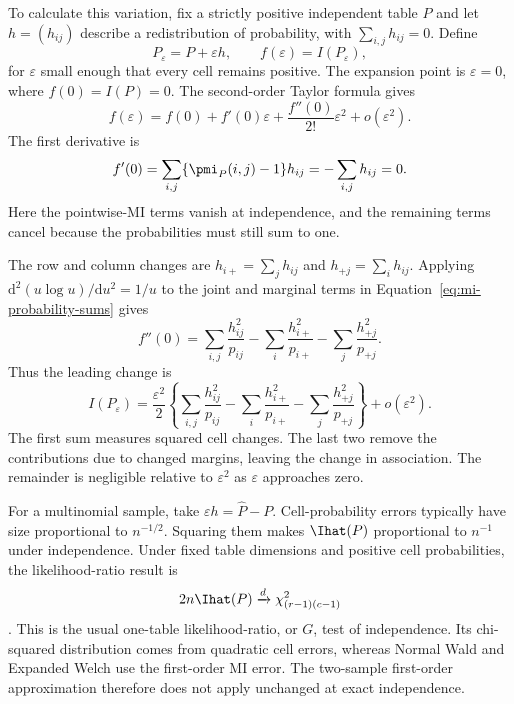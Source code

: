 To calculate this variation, fix a strictly positive independent table
\(P\) and let \(h=(h_{ij})\) describe a redistribution of probability,
with \(\sum_{i,j}h_{ij}=0\). Define
\begin{equation}
 P_\varepsilon=P+\varepsilon h,
 \qquad f(\varepsilon)=I(P_\varepsilon),
\end{equation}
for \(\varepsilon\) small enough that every cell remains positive.
The expansion point is \(\varepsilon=0\), where \(f(0)=I(P)=0\).
The second-order Taylor formula gives
\begin{equation}
 f(\varepsilon)
 =f(0)+f'(0)\varepsilon+\frac{f''(0)}{2!}\varepsilon^2
  +o(\varepsilon^2).
\end{equation}
The first derivative is
\begin{equation}
 f'(0)=\sum_{i,j}\{\pmi_P(i,j)-1\}h_{ij}
       =-\sum_{i,j}h_{ij}=0.
\end{equation}
Here the pointwise-MI terms vanish at independence, and the remaining
terms cancel because the probabilities must still sum to one.

The row and column changes are \(h_{i+}=\sum_jh_{ij}\) and
\(h_{+j}=\sum_ih_{ij}\). Applying
\(\mathrm d^2(u\log u)/\mathrm du^2=1/u\) to the joint and marginal
terms in Equation~\eqref{eq:mi-probability-sums} gives
\begin{equation}
 f''(0)=\sum_{i,j}\frac{h_{ij}^2}{p_{ij}}
        -\sum_i\frac{h_{i+}^2}{p_{i+}}
        -\sum_j\frac{h_{+j}^2}{p_{+j}}.
\end{equation}
Thus the leading change is
\begin{equation}
 I(P_\varepsilon)
 =\frac{\varepsilon^2}{2}
  \left\{\sum_{i,j}\frac{h_{ij}^2}{p_{ij}}
        -\sum_i\frac{h_{i+}^2}{p_{i+}}
        -\sum_j\frac{h_{+j}^2}{p_{+j}}\right\}
  +o(\varepsilon^2).
 \label{eq:appendix-mi-second-order}
\end{equation}
The first sum measures squared cell changes. The last two remove the
contributions due to changed margins, leaving the change in association.
The remainder is negligible relative to \(\varepsilon^2\) as
\(\varepsilon\) approaches zero.

For a multinomial sample, take \(\varepsilon h=\widehat P-P\).
Cell-probability errors typically have size proportional to \(n^{-1/2}\).
Squaring them makes \(\Ihat(P)\) proportional to \(n^{-1}\) under
independence. Under fixed table dimensions and positive cell probabilities,
the likelihood-ratio result is
\begin{equation}
 2n\Ihat(P)\xrightarrow{d}\chi^2_{(r-1)(c-1)}
 \label{eq:independence-chi-squared}
\end{equation}
\citep{wilks1938,brillinger2004}. This is the usual one-table likelihood-ratio,
or \(G\), test of independence. Its chi-squared distribution comes from
quadratic cell errors, whereas Normal Wald and Expanded Welch use the
first-order MI error. The two-sample first-order approximation therefore
does not apply unchanged at exact independence.

